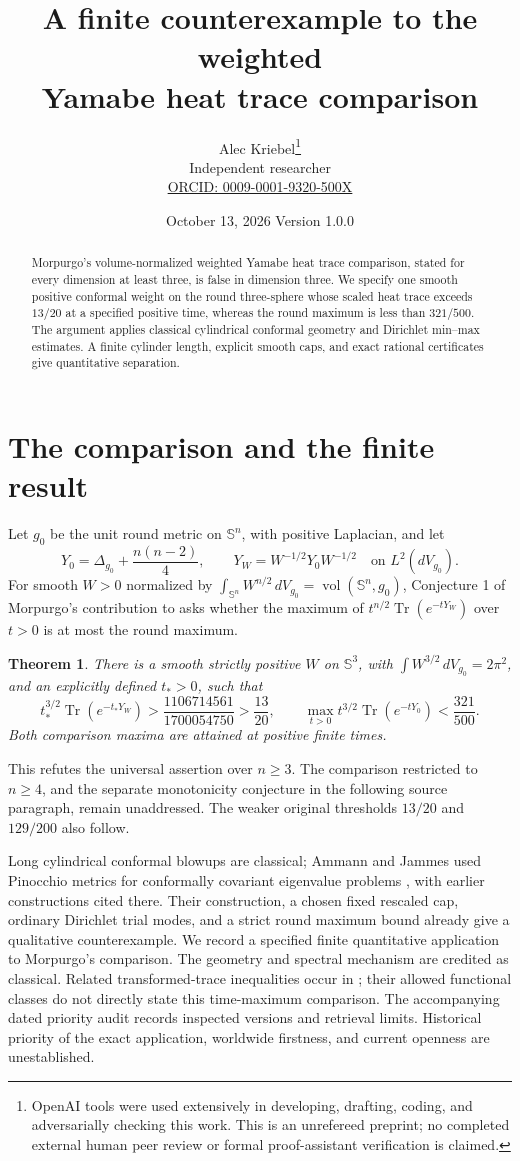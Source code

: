 \documentclass[10pt]{article}
\title{A finite counterexample to the weighted\\ Yamabe heat trace comparison}
\author{Alec Kriebel\thanks{OpenAI tools were used extensively in developing,
 drafting, coding, and adversarially checking this work. This is an unrefereed
 preprint; no completed external human peer review or formal proof-assistant
 verification is claimed.}\\
 \small Independent researcher\\
 \small\href{https://orcid.org/0009-0001-9320-500X}{ORCID: 0009-0001-9320-500X}}
\date{October 13, 2026 \quad Version 1.0.0}
\newtheorem{theorem}{Theorem}
\newcommand{\Tr}{\operatorname{Tr}}
\newcommand{\Sph}{\mathbb S}
\begin{document}
\maketitle
\begin{abstract}
Morpurgo's volume-normalized weighted Yamabe heat trace comparison,
stated for every dimension at least three, is false in dimension three.
We specify one smooth positive conformal weight on the round three-sphere
whose scaled heat trace exceeds \(13/20\) at a specified positive time,
whereas the round maximum is less than \(321/500\).
The argument applies classical cylindrical conformal geometry and
Dirichlet min--max estimates. A finite cylinder length, explicit smooth
caps, and exact rational certificates give quantitative separation.
\end{abstract}

\section{The comparison and the finite result}
Let \(g_0\) be the unit round metric on \(\Sph^n\), with positive Laplacian,
and let
\[
 Y_0=\Delta_{g_0}+\frac{n(n-2)}4,\qquad
 Y_W=W^{-1/2}Y_0W^{-1/2}\quad\text{on }L^2(dV_{g_0}).
\]
For smooth \(W>0\) normalized by
\(\int_{\Sph^n}W^{n/2}\,dV_{g_0}=\operatorname{vol}(\Sph^n,g_0)\),
Conjecture 1 of Morpurgo's contribution to \cite[printed pp.~421--422,
item (16)]{OWR} asks whether the maximum of
\(t^{n/2}\Tr(e^{-tY_W})\) over \(t>0\) is at most the round maximum.

\begin{theorem}\label{thm:main}
There is a smooth strictly positive \(W\) on \(\Sph^3\), with
\(\int W^{3/2}\,dV_{g_0}=2\pi^2\), and an explicitly defined \(t_*>0\), such that
\[
 t_*^{3/2}\Tr(e^{-t_*Y_W})
 >\frac{1106714561}{1700054750}>\frac{13}{20},
 \qquad
 \max_{t>0}t^{3/2}\Tr(e^{-tY_0})<\frac{321}{500}.
\]
Both comparison maxima are attained at positive finite times.
\end{theorem}
This refutes the universal assertion over \(n\geq3\).
The comparison restricted to \(n\geq4\), and the separate monotonicity
conjecture in the following source paragraph, remain unaddressed.
The weaker original thresholds \(13/20\) and \(129/200\) also follow.

Long cylindrical conformal blowups are classical; Ammann and Jammes
used Pinocchio metrics for conformally covariant eigenvalue problems
\cite{AJ}, with earlier constructions cited there.
Their construction, a chosen fixed rescaled cap, ordinary Dirichlet
trial modes, and a strict round maximum bound already give a qualitative
counterexample. We record a specified finite quantitative application
to Morpurgo's comparison. The geometry and spectral mechanism are credited
as classical. Related transformed-trace inequalities occur in \cite{Mor};
their allowed functional classes do not directly state this time-maximum
comparison. The accompanying dated priority audit records inspected
versions and retrieval limits. Historical priority of the exact application,
worldwide firstness, and current openness are unestablished.
\end{document}
